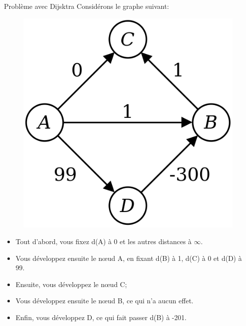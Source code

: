 \documentclass[10pt,xcolor=dvipsnames]{beamer}
\begin{document}
\begin{frame}{Problème avec Dijsktra}
Considérons le graphe suivant:
\begin{minipage}{0.5\textwidth}
\begin{figure}
    \centering
    \includegraphics[scale=0.3]{figures/CM4/dji-neg.png}
    \label{fig:my_label}
\end{figure}
\end{minipage}\begin{minipage}{0.5\textwidth}
\begin{itemize}[<+->]
    \item   Tout d'abord, vous fixez d(A) à 0 et les autres distances à $\infty$.
    \item Vous développez ensuite le nœud A, en fixant d(B) à 1, d(C) à 0 et d(D) à 99.
    \item Ensuite, vous développez le nœud C;
    \item Vous développez ensuite le nœud B, ce qui n'a aucun effet.
    \item Enfin, vous développez D, ce qui fait passer d(B) à -201.
\end{itemize}
\end{minipage}

\end{frame}
\end{document}
